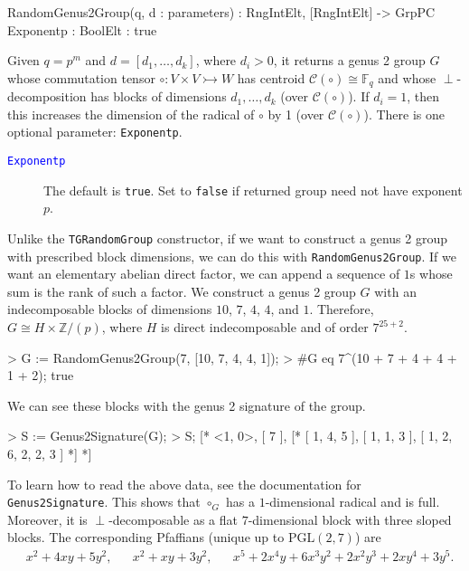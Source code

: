 \documentclass{documentation}
\begin{document}
\begin{intrinsics}
RandomGenus2Group(q, d : parameters) : RngIntElt, [RngIntElt] -> GrpPC
    Exponentp : BoolElt : true
\end{intrinsics}

Given $q=p^m$ and $d=[d_1, \dots, d_k]$, where $d_i>0$, it returns a genus 2 group $G$ whose commutation tensor $\circ : V\times V\rightarrowtail W$ has centroid $\mathcal{C}(\circ)\cong \mathbb{F}_q$ and whose $\perp$-decomposition has blocks of dimensions $d_1,\dots,d_k$ (over $\mathcal{C}(\circ)$).
If $d_i=1$, then this increases the dimension of the radical of $\circ$ by 1 (over $\mathcal{C}(\circ)$).
There is one optional parameter: \texttt{Exponentp}. 

\begin{description}
\item[\textcolor{blue}{\tt Exponentp}]
The default is \texttt{true}.
Set to \texttt{false} if returned group need not have exponent $p$.  
\end{description}

\begin{example}[PrescribedBlocks]
    Unlike the \texttt{TGRandomGroup} constructor, if we want to construct a genus 2 group with prescribed block dimensions, we can do this with \texttt{RandomGenus2Group}. If we want an elementary abelian direct factor, we can append a sequence of $1$s whose sum is the rank of such a factor. We construct a genus 2 group $G$ with an indecomposable blocks of dimensions $10$, $7$, $4$, $4$, and $1$. Therefore, $G\cong H\times \mathbb{Z}/(p)$, where $H$ is direct indecomposable and of order $7^{25+2}$. 
\begin{code}
> G := RandomGenus2Group(7, [10, 7, 4, 4, 1]);
> #G eq 7^(10 + 7 + 4 + 4 + 1 + 2);
true        
\end{code}

    We can see these blocks with the genus 2 signature of the group. 
\begin{code}
> S := Genus2Signature(G);
> S;
[* <1, 0>,
[ 7 ],
[*
[ 1, 4, 5 ],
[ 1, 1, 3 ],
[ 1, 2, 6, 2, 2, 3 ]
*]
*]    
\end{code}

To learn how to read the above data, see the documentation for \texttt{Genus2Signature}. This shows that $\circ_G$ has a $1$-dimensional radical and is full. Moreover, it is $\perp$-decomposable as a flat $7$-dimensional block with three sloped blocks. The corresponding Pfaffians (unique up to $\mathrm{PGL}(2, 7)$) are 
\begin{align*}
    & x^2 + 4xy + 5y^2, & & x^2 + xy + 3y^2, & & x^5 + 2x^4y + 6x^3y^2 + 2x^2y^3 + 2xy^4 + 3y^5.
\end{align*}
\end{example}
\end{document}
